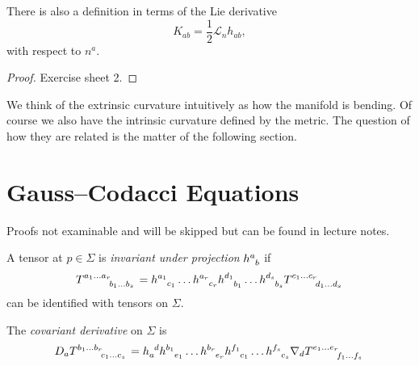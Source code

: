 \begin{lemma}
  There is also a definition in terms of the Lie derivative
  \begin{equation}
    K_{ab} = \frac{1}{2} \mathcal{L}_n h_{ab},
  \end{equation}
  with respect to $n^a$.
\end{lemma}
\begin{proof}
  Exercise sheet 2.
\end{proof}

We think of the extrinsic curvature intuitively as how the manifold is bending.
Of course we also have the intrinsic curvature defined by the metric. The question of how they are related is the matter of the following section.

\section{Gauss--Codacci Equations}%
\label{sec:gauss_codacci_equations}

\begin{leftbar}
  Proofs not examinable and will be skipped but can be found in lecture notes.
\end{leftbar}

\begin{definition}[invariant]
  A tensor at $p \in \Sigma$ is \emph{invariant under projection} $h\indices{^{a}_{b}}$ if
  \begin{equation}
    T\indices{^{a_1 \dots a_r}_{b_1 \dots b_s}} = h\indices{^{a_1}_{c_1}} \dots h\indices{^{a_r}_{c_r}} h\indices{^{d_1}_{b_1}} \dots h\indices{^{d_s}_{b_s}} T\indices{^{c_1 \dots c_r}_{d_1 \dots d_s}}
  \end{equation}
  can be identified with tensors on $\Sigma$.
\end{definition}
\begin{definition}
  The \emph{covariant derivative} on $\Sigma$ is 
  \begin{equation}
    D_a T \indices{^{b_1 \dots b_r}_{c_1 \dots c_s}} = h\indices{_{a}^{d}} h\indices{^{b_1}_{e_1}} \dots h\indices{^{b_r}_{e_r}} h\indices{^{f_1}_{c_1}} \dots h\indices{^{f_s}_{c_s}} \nabla_d T \indices{^{e_1 \dots e_r}_{f_1 \dots f_s}}
  \end{equation}
\end{definition}

